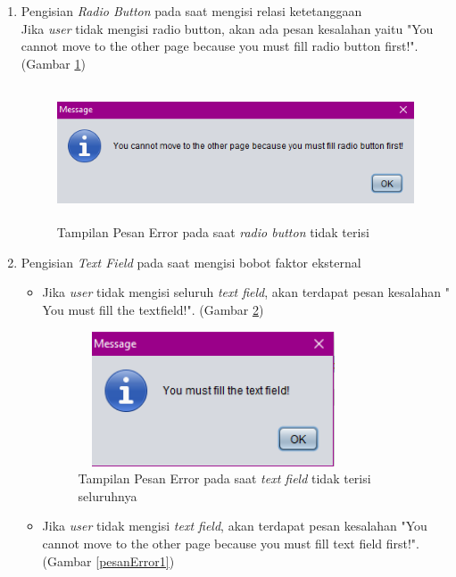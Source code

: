 \begin{enumerate}
\begin{itemize}
	\end{itemize}
	
	\item Pengisian \textit{Radio Button} pada saat mengisi relasi ketetanggaan\\
	Jika \textit{user} tidak mengisi radio button, akan ada pesan kesalahan yaitu "You cannot move to the other page because you must fill radio button first!". (Gambar \ref{pesanError3})
	
		\begin{figure} [H]
	\centering  
	\includegraphics[width=11cm, height=4cm]{pesanError3} 
		\caption[Tampilan Pesan Error pada saat \textit{radio button} tidak terisi]{Tampilan Pesan Error pada saat \textit{radio button} tidak terisi}
	\label{pesanError3} 
\end{figure}

\item Pengisian \textit{Text Field} pada saat mengisi bobot faktor eksternal
	\begin{itemize}
		
		\item Jika \textit{user} tidak mengisi seluruh \textit{text field}, akan terdapat pesan kesalahan " You must fill the textfield!". (Gambar \ref{pesanError4})
		
	\begin{figure} [H]
	\centering  
	\includegraphics[width=8cm, height=4cm]{pesanError4} 
		\caption[Tampilan Pesan Error pada saat \textit{text field} tidak terisi seluruhnya]{Tampilan Pesan Error pada saat \textit{text field} tidak terisi seluruhnya}
	\label{pesanError4} 
\end{figure}
		
		\item Jika \textit{user} tidak mengisi \textit{text field}, akan terdapat pesan kesalahan "You cannot move to the other page because you must fill text field first!". (Gambar \ref{pesanError1})
		

\end{itemize}
\end{enumerate}
